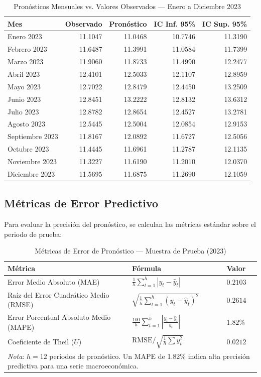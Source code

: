 \documentclass[12pt, letterpaper]{article}
\begin{document}
\begin{table}[H]
\centering
\caption{Pronósticos Mensuales vs. Valores Observados — Enero a Diciembre 2023}
\label{tab:forecast}
\begin{tabular}{lrrrr}
\toprule
\textbf{Mes} & \textbf{Observado} & \textbf{Pronóstico} & \textbf{IC Inf. 95\%} & \textbf{IC Sup. 95\%} \\
\midrule
Enero 2023    & 11.1047 & 11.0468 & 10.7746 & 11.3190 \\
Febrero 2023  & 11.6487 & 11.3991 & 11.0584 & 11.7399 \\
Marzo 2023    & 11.9060 & 11.8733 & 11.4990 & 12.2477 \\
Abril 2023    & 12.4101 & 12.5033 & 12.1107 & 12.8959 \\
Mayo 2023     & 12.7022 & 12.8479 & 12.4450 & 13.2509 \\
Junio 2023    & 12.8451 & 13.2222 & 12.8132 & 13.6312 \\
Julio 2023    & 12.8782 & 12.8654 & 12.4527 & 13.2781 \\
Agosto 2023   & 12.5445 & 12.5004 & 12.0854 & 12.9153 \\
Septiembre 2023 & 11.8167 & 12.0892 & 11.6727 & 12.5056 \\
Octubre 2023  & 11.4445 & 11.6961 & 11.2787 & 12.1135 \\
Noviembre 2023 & 11.3227 & 11.6190 & 11.2010 & 12.0370 \\
Diciembre 2023 & 11.5695 & 11.6875 & 11.2690 & 12.1059 \\
\bottomrule
\end{tabular}
\end{table}

\subsection{Métricas de Error Predictivo}

Para evaluar la precisión del pronóstico, se calculan las métricas estándar sobre el periodo de prueba:

\begin{table}[H]
\centering
\caption{Métricas de Error de Pronóstico — Muestra de Prueba (2023)}
\label{tab:metricas}
\begin{tabular}{lll}
\toprule
\textbf{Métrica} & \textbf{Fórmula} & \textbf{Valor} \\
\midrule
Error Medio Absoluto (MAE)          & $\frac{1}{h}\sum_{t=1}^h |y_t - \hat y_t|$ & $0.2103$ \\[6pt]
Raíz del Error Cuadrático Medio (RMSE) & $\sqrt{\frac{1}{h}\sum_{t=1}^h (y_t - \hat y_t)^2}$ & $0.2614$ \\[6pt]
Error Porcentual Absoluto Medio (MAPE) & $\frac{100}{h}\sum_{t=1}^h \left|\frac{y_t-\hat y_t}{y_t}\right|$ & $1.82\%$ \\[6pt]
Coeficiente de Theil ($U$)           & $\text{RMSE} / \sqrt{\frac{1}{h}\sum \hat y_t^2}$ & $0.0212$ \\
\bottomrule
\multicolumn{3}{p{13cm}}{\small \textit{Nota}: $h=12$ periodos de pronóstico. Un MAPE de 1.82\% indica alta precisión predictiva para una serie macroeconómica.}
\end{tabular}
\end{table}
\end{document}
